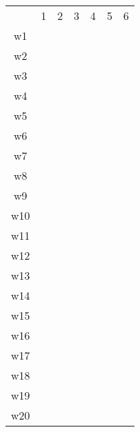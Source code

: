 \renewcommand{\arraystretch}{1.2}
\begin{center}
    \begin{tabular}{ c c c c c c c }
       & 1 & 2 & 3 & 4 & 5 & 6 \\ 
     w1 & \cellcolor{yellow} &   \\  
     w2 & \cellcolor{yellow} &   \\ 
     w3 &   & \cellcolor{cyan} \\ 
     w4 &   & \cellcolor{cyan} \\
     w5 &   & \cellcolor{cyan} \\  
     w6 &   &   \\ 
     w7 &   &   \\ 
     w8 &   &   \\
     w9 &   &   \\  
     w10 &   &   \\ 
     w11 &   &   \\ 
     w12 &   &   \\
     w13 &   &   \\  
     w14 &   &   \\ 
     w15 &   &   \\ 
     w16 &   &   \\ 
     w17 &   &   \\  
     w18 &   &   \\ 
     w19 &   &   \\ 
     w20 &   &   \\   
    \end{tabular}
\end{center}